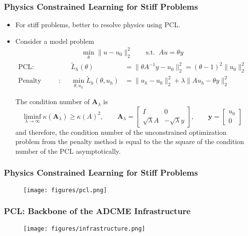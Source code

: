 \documentclass[usenames,dvipsnames]{beamer}
\begin{document}
\begin{frame}
	\frametitle{Physics Constrained Learning for Stiff Problems}
	
	\begin{itemize}
		\item For stiff problems, better to resolve physics using PCL.
		\item Consider a model problem 
		\begin{gather*}
			\min_{\theta} \|u-u_0\|^2_2 \qquad \text{s.t.} \;\; Au = \theta y
		\end{gather*}
	\vspace{-0.5cm}
	\begin{align*}
		\text{PCL}: &&\ \tilde L_h(\theta) &= \|\theta A^{-1} y - u_0\|^2_2 = (\theta-1)^2\|u_0\|_2^2\\
				\text{Penalty Method}: &&\ 
			\min_{\theta, u_h}\tilde L_h(\theta, u_h) &= \|u_h-u_0\|^2_2 + \lambda \|Au_h -\theta y\|_2^2
	\end{align*}
\begin{theorem}
	The condition number of $\mathbf{A}_\lambda$ is 
	\begin{equation*}
		\liminf_{\lambda\rightarrow \infty}\kappa(\mathbf{A}_\lambda)  \geq  \kappa(A)^2,\qquad \mathbf{A}_\lambda = \begin{bmatrix}
			I & 0\\
			\sqrt{\lambda}A & -\sqrt{\lambda}y
		\end{bmatrix}, \qquad 
		\mathbf{y} = \begin{bmatrix}
			u_0\\ 0
		\end{bmatrix}
	\end{equation*}
	and therefore, the condition number of the unconstrained optimization problem from the penalty method is equal to the the square of the condition number of the PCL asymptotically. 
\end{theorem}
 	\end{itemize}
\end{frame}

\begin{frame}
	\frametitle{Physics Constrained Learning for Stiff Problems}
	\begin{figure}[hbt]
		\centering
		\texttt{[image: figures/pcl.png]}
	\end{figure}
\end{frame}



\begin{frame}
	\frametitle{PCL: Backbone of the ADCME Infrastructure}
	
	
	\begin{figure}[hbt]
		\centering
		\texttt{[image: figures/infrastructure.png]}
	\end{figure}
\end{frame}
\end{document}
